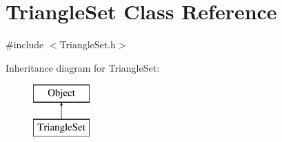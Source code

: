 \hypertarget{class_triangle_set}{}\section{Triangle\+Set Class Reference}
\label{class_triangle_set}


{\ttfamily \#include $<$Triangle\+Set.\+h$>$}

Inheritance diagram for Triangle\+Set\+:\begin{figure}[H]
\begin{center}
\leavevmode
\includegraphics[height=2.000000cm]{class_triangle_set}
\end{center}
\end{figure}
